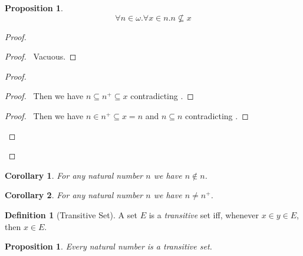 \documentclass{report}
\let\qed\relax
\newtheorem{prop}[ax]{Proposition}
\newtheorem{cor}{Corollary}[ax]
\theoremstyle{definition}
\newtheorem{df}[ax]{Definition}
\begin{document}
\begin{prop}
\label{prop:natural_number_not_subset}
\[ \forall n \in \omega. \forall x \in n. n \not\subseteq x \]
\end{prop}

\begin{proof}
\pf
{}
\begin{proof}
	\pf\ Vacuous.
\end{proof}
\begin{proof}
	\begin{proof}
		\pf\ Then we have $n \subseteq n^+ \subseteq x$ contradicting .
	\end{proof}
	\begin{proof}
		\pf\ Then we have $n \in n^+ \subseteq x = n$ and $n \subseteq n$ contradicting .
	\end{proof}
\end{proof}
\qed
\end{proof}

\begin{cor}
\label{cor:n_notin_n}
For any natural number $n$ we have $n \notin n$.
\end{cor}

\begin{cor}
For any natural number $n$ we have $n \neq n^+$.
\end{cor}

\begin{df}[Transitive Set]
A set $E$ is a \emph{transitive} set iff, whenever $x \in y \in E$, then $x \in E$.
\end{df}

\begin{prop}
\label{prop:natural_number_transitive}
Every natural number is a transitive set.
\end{prop}
\end{document}
